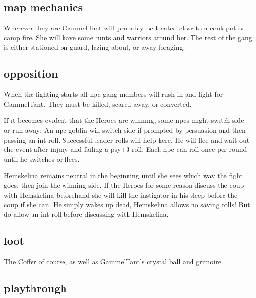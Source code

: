 \subsection*{map mechanics}

Wherever they are GammelTant will probably be located close to a cook pot or camp fire. She will have some runts and warriors around her. The rest of the gang is either stationed on guard, lazing about, or away foraging.


\subsection*{opposition}

When the fighting starts all npc gang members will rush in and fight for GammelTant. They must be killed, scared away, or converted. 

If it becomes evident that the Heroes are winning, some npcs might switch side or run away: An npc goblin will switch side if prompted by persuasion and then passing an int roll. Successful leader rolls will help here. He will flee and wait out the event after injury and failing a psy+3 roll. Each npc can roll once per round until he switches or flees.

Hemskelina remains neutral in the beginning until she sees which way the fight goes, then join the winning side. If the Heroes for some reason discuss the coup with Hemskelina beforehand she will kill the instigator in his sleep before the coup if she can. He simply wakes up dead, Hemskelina allows no saving rolls! But do allow an int roll before discussing with Hemskelina.


\subsection*{loot}

The Coffer of course, as well as GammelTant's crystal ball and grimoire.


\subsection*{playthrough}

